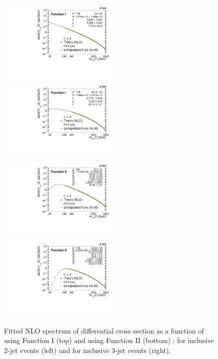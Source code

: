 \begin{figure}[h]
  \begin{center}
    \includegraphics[width=0.51\textwidth]{Plots_HT_2_150/Extrapolate_Theory_2_HT_2_150_funcI.pdf}%
    ~~\includegraphics[width=0.51\textwidth]{Plots_HT_2_150/Extrapolate_Theory_3_HT_2_150_funcI.pdf}\\
    \vspace{5mm}
    \includegraphics[width=0.51\textwidth]{Plots_HT_2_150/Extrapolate_Theory_2_HT_2_150_funcII.pdf}%
    ~~\includegraphics[width=0.51\textwidth]{Plots_HT_2_150/Extrapolate_Theory_3_HT_2_150_funcII.pdf}\\
    \caption{Fitted NLO spectrum of differential cross section as a function of \httwo using Function I (top) and using Function II (bottom) : for inclusive 2-jet events (left) and for inclusive 3-jet events (right).}
    \label{fig:fit}
  \end{center}
\end{figure}


